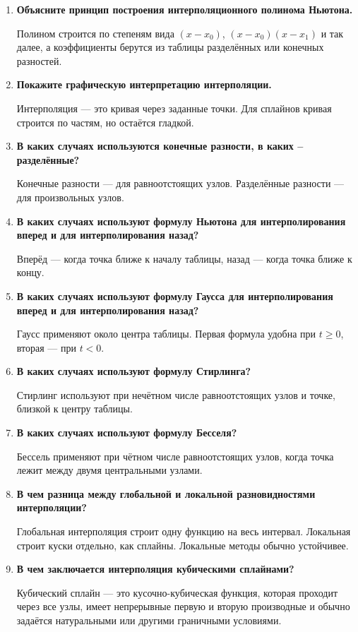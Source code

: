 \documentclass[12pt,a4paper]{article}
\begin{document}
\begin{enumerate}
\item \textbf{Объясните принцип построения интерполяционного полинома Ньютона.}

Полином строится по степеням вида $(x-x_0)$, $(x-x_0)(x-x_1)$ и так далее, а коэффициенты берутся из таблицы разделённых или конечных разностей.

\item \textbf{Покажите графическую интерпретацию интерполяции.}

Интерполяция --- это кривая через заданные точки. Для сплайнов кривая строится по частям, но остаётся гладкой.

\item \textbf{В каких случаях используются конечные разности, в каких – разделённые?}

Конечные разности --- для равноотстоящих узлов. Разделённые разности --- для произвольных узлов.

\item \textbf{В каких случаях используют формулу Ньютона для интерполирования вперед и для интерполирования назад?}

Вперёд --- когда точка ближе к началу таблицы, назад --- когда точка ближе к концу.

\item \textbf{В каких случаях используют формулу Гаусса для интерполирования вперед и для интерполирования назад?}

Гаусс применяют около центра таблицы. Первая формула удобна при $t\ge0$, вторая --- при $t<0$.

\item \textbf{В каких случаях используют формулу Стирлинга?}

Стирлинг используют при нечётном числе равноотстоящих узлов и точке, близкой к центру таблицы.

\item \textbf{В каких случаях используют формулу Бесселя?}

Бессель применяют при чётном числе равноотстоящих узлов, когда точка лежит между двумя центральными узлами.

\item \textbf{В чем разница между глобальной и локальной разновидностями интерполяции?}

Глобальная интерполяция строит одну функцию на весь интервал. Локальная строит куски отдельно, как сплайны. Локальные методы обычно устойчивее.

\item \textbf{В чем заключается интерполяция кубическими сплайнами?}

Кубический сплайн --- это кусочно-кубическая функция, которая проходит через все узлы, имеет непрерывные первую и вторую производные и обычно задаётся натуральными или другими граничными условиями.
\end{enumerate}
\end{document}
